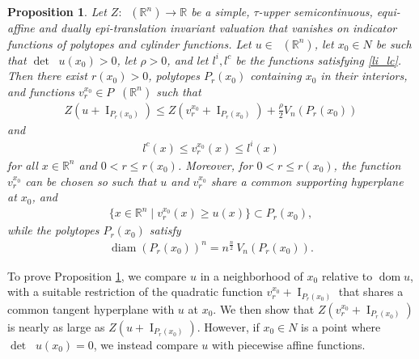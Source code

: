 \documentclass[11pt]{article}
\newtheorem{prop}[teo]{Proposition}
\theoremstyle{definition} %
\newcommand{\RR}{(\mathbb{R}^n)}
\DeclareMathOperator{\I}{I}
\DeclareMathOperator{\LQ}{_{l.q}}
\DeclareMathOperator{\dom}{dom}
\DeclareMathOperator{\D}{D^2}
\DeclareMathOperator{\LP}{Conv_{lp}}
\DeclareMathOperator{\diam}{diam}
\begin{document}
\begin{prop}\label{regular}
Let $Z:\LP\RR\rightarrow\mathbb{R}$ be a simple, $\tau$-upper semicontinuous, equi-affine and  dually epi-translation   invariant valuation that   vanishes on  indicator functions of polytopes and cylinder functions. Let $u \in \LP(\mathbb{R}^n)$,
let $x_0\in N$ be such that $\det\D u(x_0)>0$,  let $\rho>0$, and let $l^i, l^c$  be the functions satisfying \eqref{li_lc}. Then there exist $r(x_0)>0$, 
polytopes $P_r(x_0)$ containing $x_0$ in their interiors, and  functions $v_r^{x_0}\in P\LQ\RR$ such that
\begin{align}\label{eq10.47}
  Z(u+\I_{P_r(x_0)}) \leq Z(v_r^{x_0}+\I_{P_r(x_0)}) + \frac{\rho}{2}V_n(P_r(x_0))
\end{align}
and
\begin{align}\label{eq10.48}
l^c(x)\leq v_r^{x_0}(x)\leq l^i(x)    
\end{align}
for all $x\in \mathbb{R}^n$ and $0<r\leq r(x_0)$. Moreover, for $0<r\leq r(x_0)$,  the function $v_r^{x_0}$ can be chosen so such that
$u$ and $v_r^{x_0}$ share a common supporting hyperplane at $x_0$, and 
\begin{align}\label{eq4111}
 \{x\in \mathbb{R}^n\mid v_r^{x_0}(x)\geq u(x)\}   \subset P_r(x_0), 
\end{align}
while the  polytopes $P_r(x_0)$ satisfy 
\begin{align}\label{eq10.26..}
\diam(P_r(x_0))^n= n^{\frac{n}{2}}\, V_n(P_r(x_0)).    
\end{align}
\end{prop}





To prove Proposition \ref{regular}, we compare $u$ in a neighborhood of $x_0$ relative to $\dom u$, with  a suitable restriction of 
the quadratic function $v_r^{x_0}+\I_{P_r(x_0)}$ that shares a common tangent hyperplane with $u$ at $x_0$. We then show that $Z(v_r^{x_0}+\I_{P_r(x_0)})$  is nearly as large as $Z(u+\I_{P_r(x_0)})$. However, if $x_0\in N$ is a point where $\det \D u(x_0)=0$, we instead compare $u$ with piecewise affine functions.
\end{document}
